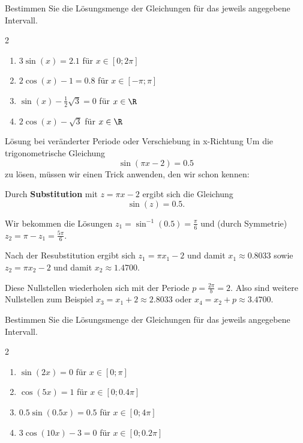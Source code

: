 \documentclass[11pt, a4paper, oneside]{article}
\begin{document}
	
	Bestimmen Sie die Lösungsmenge der Gleichungen für das jeweils angegebene Intervall.
	
	\begin{multicols}{2}
		\begin{enumerate}[label=\alph*)]
			\item $3\sin(x) = 2.1$ für $x \in \left[0; 2\pi\right]$
			\item $2\cos(x)-1 = 0.8$ für $x \in \left[-\pi; \pi\right]$
			\item $\sin(x)-\frac{1}{2}\sqrt{3}=0$ für $x \in \R$
			\item $2\cos(x)-\sqrt{3}$ für $x \in \R$
		\end{enumerate}
	\end{multicols}
	
	\checkered[13.5cm]
	
	\begin{warning}{Lösung bei veränderter Periode oder Verschiebung in x-Richtung}
		Um die trigonometrische Gleichung $$\sin(\pi x - 2) = 0.5$$ zu lösen, müssen wir einen Trick anwenden, den wir schon kennen:
		
		Durch \textbf{Substitution} mit $z = \pi x - 2$ ergibt sich die Gleichung $$\sin(z) = 0.5.$$
		
		Wir bekommen die Lösungen $z_1 = \sin^{-1}(0.5) = \frac{\pi}{6}$ und (durch Symmetrie) $z_2 = \pi - z_1 = \frac{5\pi}{6}.$
		
		Nach der Resubstitution ergibt sich $z_1 = \pi x_1 - 2$ und damit $x_1 \approx 0.8033$ sowie $z_2 = \pi x_2 - 2$ und damit $x_2 \approx 1.4700.$
		
		Diese Nullstellen wiederholen sich mit der Periode $p = \frac{2\pi}{b} = 2$.
		Also sind weitere Nullstellen zum Beispiel $x_3 = x_1 + 2 \approx 2.8033$ oder $x_4 = x_2 + p \approx 3.4700.$
	\end{warning}
	
	
	Bestimmen Sie die Lösungsmenge der Gleichungen für das jeweils angegebene Intervall.
	
	\begin{multicols}{2}
		\begin{enumerate}[label=\alph*)]
			\item $\sin(2x) = 0$ für $x \in \left[0; \pi\right]$
			\item $\cos(5x) = 1$ für $x \in \left[0; 0.4\pi\right]$
			\item $0.5\sin(0.5x) = 0.5$ für $x \in \left[0; 4\pi\right]$
			\item $3\cos(10x)-3 = 0$ für $x \in \left[0; 0.2\pi\right]$
		\end{enumerate}
	\end{multicols}
	
	\checkered[9cm]
	
	\let\clearpage\relax
\end{document}
